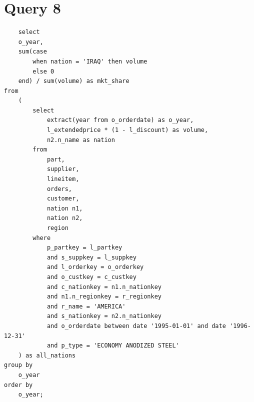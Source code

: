 \documentclass[a4paper,12pt]{scrreprt}
\begin{document}
\section{Query 8}
\begin{lstlisting}
    select
    o_year,
    sum(case
        when nation = 'IRAQ' then volume
        else 0
    end) / sum(volume) as mkt_share
from
    (
        select
            extract(year from o_orderdate) as o_year,
            l_extendedprice * (1 - l_discount) as volume,
            n2.n_name as nation
        from
            part,
            supplier,
            lineitem,
            orders,
            customer,
            nation n1,
            nation n2,
            region
        where
            p_partkey = l_partkey
            and s_suppkey = l_suppkey
            and l_orderkey = o_orderkey
            and o_custkey = c_custkey
            and c_nationkey = n1.n_nationkey
            and n1.n_regionkey = r_regionkey
            and r_name = 'AMERICA'
            and s_nationkey = n2.n_nationkey
            and o_orderdate between date '1995-01-01' and date '1996-12-31'
            and p_type = 'ECONOMY ANODIZED STEEL'
    ) as all_nations
group by
    o_year
order by
    o_year;
\end{lstlisting}
\end{document}

